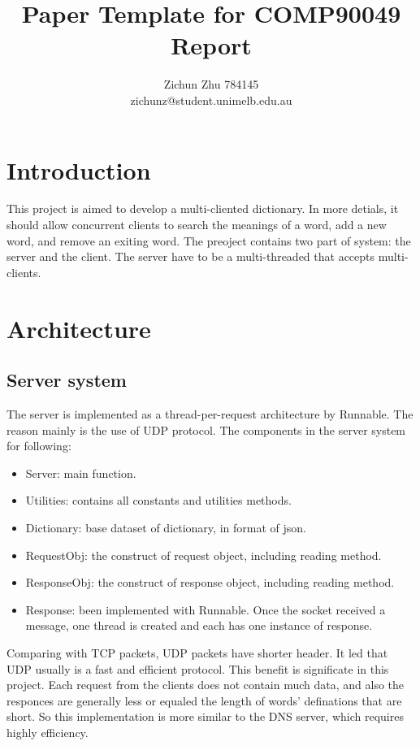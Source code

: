 \documentclass[11pt]{article}
\title{Paper Template for COMP90049 Report}
\author{Zichun Zhu 784145\\
	\large zichunz@student.unimelb.edu.au}
\begin{document}
\maketitle
\section{Introduction}
This project is aimed to develop a multi-cliented dictionary. In more detials, it should allow concurrent clients to search the meanings of a word, add a new word, and remove an exiting word. The preoject contains two part of system: the server and the client. The server have to be a multi-threaded that accepts multi-clients.

\section{Architecture}
\subsection{Server system}
The server is implemented as a thread-per-request architecture by Runnable. The reason mainly is the use of UDP protocol. The components in the server system for following:
\begin{itemize}
\item Server: main function.
\item Utilities: contains all constants and utilities methods.
\item Dictionary: base dataset of dictionary, in format of json.
\item RequestObj: the construct of request object, including reading method.
\item ResponseObj: the construct of response object, including reading method.
\item Response: been implemented with Runnable. Once the socket received a message, one thread is created and each has one instance of response.
\end{itemize}


Comparing with TCP packets, UDP packets have shorter header. It led that UDP usually is a fast and efficient protocol. This benefit is significate in this project. Each request from the clients does not contain much data, and also the responces are generally less or equaled the length of words' definations that are short. So this implementation is more similar to the DNS server, which requires highly efficiency. 
\end{document}
